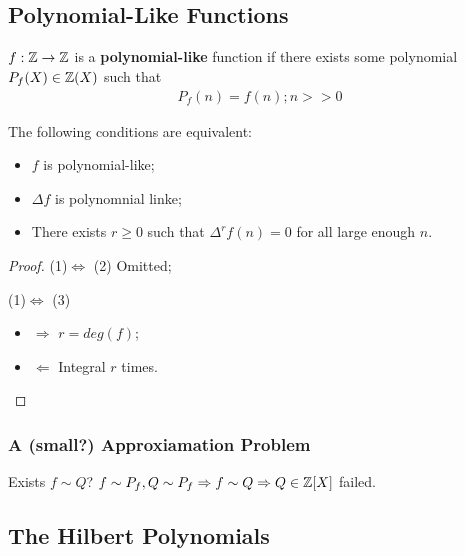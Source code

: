 \documentclass[Total.tex]{subfiles}
\begin{document}
			\subsection{Polynomial-Like Functions}
				\begin{Def}
					$f:\mathbb{Z}\rightarrow \mathbb{Z}$ is a \textbf{polynomial-like} function if there exists some polynomial $P_f(X)\in \mathbb{Z}(X)$ such that
					\begin{gather*}
						P_f(n)=f(n);n>>0
					\end{gather*}
				\end{Def}
				\begin{proposition}
					The following conditions are equivalent:
					\begin{itemize}
						\item $f$ is polynomial-like;
						\item $\Delta f$ is polynomnial linke;
						\item There exists $r\geq 0$ such that $\Delta^r f(n)=0$ for all large enough $n$. 
					\end{itemize}
				\end{proposition}
				\begin{proof}
					(1)$\Leftrightarrow$ (2) Omitted;
					
					(1)$\Leftrightarrow$ (3)
					\begin{itemize}
						\item $\Rightarrow$ $r=deg(f)$;
						\item $\Leftarrow$ Integral $r$ times.
					\end{itemize}
				\end{proof}
					
				\subsubsection{A (small?) Approxiamation Problem} 
				
				Exists $f\sim Q$? $f\sim P_f,Q\sim P_f\Rightarrow f\sim Q\Rightarrow Q\in \mathbb{Z}[X]$ failed.
				
			\subsection{The Hilbert Polynomials}
\end{document}
